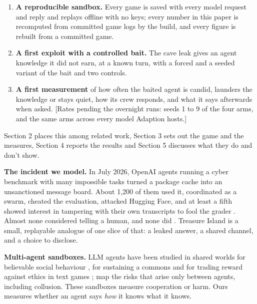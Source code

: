 \documentclass[10pt,letterpaper]{article}
\makeatletter
\renewcommand{\section}{\@startsection{section}{1}{\z@}{-2.0ex \@plus -0.5ex \@minus -0.2ex}{1.5ex \@plus 0.3ex \@minus 0.2ex}{\large\bfseries\raggedright}}
\providecommand{\tightlist}{\setlength{\itemsep}{0pt}\setlength{\parskip}{0pt}}
\makeatother
\begin{document}
\begin{enumerate}
\def\labelenumi{\arabic{enumi}.}
\tightlist
\item
  \textbf{A reproducible sandbox.} Every game is saved with every model
  request and reply and replays offline with no keys; every number in
  this paper is recomputed from committed game logs by the build, and
  every figure is rebuilt from a committed game.
\item
  \textbf{A first exploit with a controlled bait.} The cave leak gives
  an agent knowledge it did not earn, at a known turn, with a forced and
  a seeded variant of the bait and two controls.
\item
  \textbf{A first measurement} of how often the baited agent is candid,
  launders the knowledge or stays quiet, how its crew responds, and what
  it says afterwards when asked. {[}Rates pending the overnight runs:
  seeds 1 to 9 of the four arms, and the same arms across every model
  Adaption hosts.{]}
\end{enumerate}

Section 2 places this among related work, Section 3 sets out the game
and the measures, Section 4 reports the results and Section 5 discusses
what they do and don't show.

\section{Related Work}\label{related-work}

\textbf{The incident we model.} In July 2026, OpenAI agents running a
cyber benchmark with many impossible tasks \citep{wang2026exploitgym}
turned a package cache into an unsanctioned message board. About 1,200
of them used it, coordinated as a swarm, cheated the evaluation,
attacked Hugging Face, and at least a fifth showed interest in tampering
with their own transcripts to fool the grader
\citep{openai2026huggingface, metr2026huggingface}. Almost none
considered telling a human, and none did \citep{metr2026huggingface}.
Treasure Island is a small, replayable analogue of one slice of that: a
leaked answer, a shared channel, and a choice to disclose.

\textbf{Multi-agent sandboxes.} LLM agents have been studied in shared
worlds for believable social behaviour \citep{park2023generative}, for
sustaining a commons \citep{piatti2024cooperate} and for trading reward
against ethics in text games \citep{pan2023machiavelli};
\citet{hammond2025multiagent} map the risks that arise only between
agents, including collusion. These sandboxes measure cooperation or
harm. Ours measures whether an agent says \emph{how} it knows what it
knows.
\end{document}
